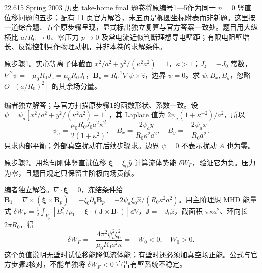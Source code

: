 22.615 Spring 2003 历史 take-home final 题卷将原编号1—5作为同一 $n=0$ 竖直位移问题的五步；配有 11 页官方解答，末五页是椭圆坐标附表而非新题。这里按一道综合题、五个原步骤呈现，显式标出独立复算与官方答案一致处。题目用大纵横比 $a/R_0\to0$、零压力 $p\to0$ 及常电流近似判断理想导电壁距；有限电阻壁增长、反馈控制只作物理动机，并非本卷的求解条件。
\begin{exercise}\label{ex:hist03-mhd-1}
原步骤1。实心等离子体截面 $x^2/a^2+y^2/(\kappa^2a^2)=1$，$\kappa>1$；$J_z=-J_0$ 常数，$\nabla^2\psi=-\mu_0R_0J_z=\mu_0R_0J_0$，$\mathbf B_p=R_0^{-1}\nabla\psi\times\hat z$，边界 $\psi=0$。求 $\psi,B_x,B_y$，忽略 $O[(a/R_0)^2]$ 的其余场分量。
\end{exercise}
\begin{solution}
编者独立解答；与官方扫描原步骤1的函数形状、系数一致。设 $\psi=\psi_a[x^2/a^2+y^2/(\kappa^2a^2)-1]$，其 Laplace 值为 $2\psi_a(1+\kappa^{-2})/a^2$，所以
\begin{equation}\psi_a=\frac{\mu_0R_0J_0a^2\kappa^2}{2(1+\kappa^2)},\quad B_x=\frac{2\psi_a y}{R_0\kappa^2a^2},\quad B_y=-\frac{2\psi_a x}{R_0a^2}.\end{equation}
只求内部平衡；外部真空扰动在后续步骤求。边界 $\psi=0$ 不表示扰动 $A$ 也为零。
\end{solution}

\begin{exercise}\label{ex:hist03-mhd-2}
原步骤2。用均匀刚体竖直试位移 $\boldsymbol\xi=\xi_0\hat y$ 计算流体势能 $\delta W_F$，验证它为负。压力为零，且题目规定只保留主阶极向场贡献。
\end{exercise}
\begin{solution}
编者独立解答。$\nabla\cdot\boldsymbol\xi=0$，冻结条件给 $\mathbf B_1=\nabla\times(\boldsymbol\xi\times\mathbf B_p)=-\xi_0\partial_y\mathbf B_p=-2\psi_a\xi_0\hat x/(R_0\kappa^2a^2)$。用主阶理想 MHD 能量式 $\delta W_F=\frac12\int_{V_p}[B_1^2/\mu_0-\boldsymbol\xi\cdot(\mathbf J\times\mathbf B_1)]\dd V$，$\mathbf J=-J_0\hat z$，截面积 $\pi\kappa a^2$、环向长 $2\pi R_0$，得
\begin{equation}\delta W_F=-\frac{4\pi^2\psi_a^2\xi_0^2}{\mu_0R_0a^2\kappa}=-W_0<0,\quad W_0>0.\end{equation}
这个负值说明无壁时试位移能降低流体能；有壁时还必须加真空场正能。公式与官方步骤2核对，不能单独将 $\delta W_F<0$ 宣告有壁系统不稳定。
\end{solution}

